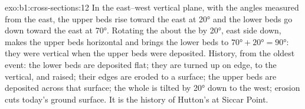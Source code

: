\begin{solution}{exo:b1:cross-sections:12}
In the east--west vertical plane, with the angles measured from the east,
the upper beds rise toward the east at \ang{20} and the lower beds go down
toward the east at \ang{70}. Rotating the  about the  by
\ang{20}, east side down, makes the upper beds horizontal and brings the
lower beds to $\ang{70} + \ang{20} = \ang{90}$: they were vertical when the
upper beds were deposited. History, from the oldest event: the lower beds are
deposited flat; they are turned up on edge, to the vertical, and raised;
their edges are eroded to a surface; the upper beds are deposited across that
surface; the whole is tilted by \ang{20} down to the west; erosion cuts
today's ground surface. It is the history of Hutton's  at Siccar
Point.
\end{solution}

